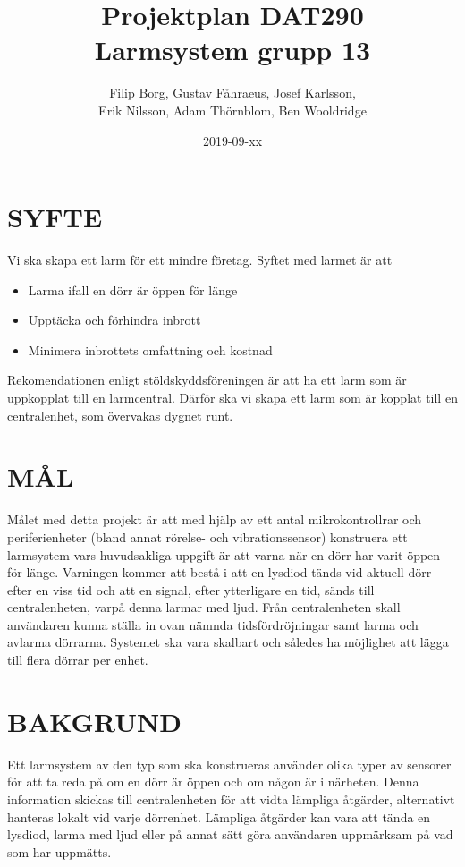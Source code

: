 \documentclass[a4paper]{article}
\title{Projektplan DAT290 \\ \Large Larmsystem grupp 13}
\author{Filip Borg, Gustav Fåhraeus, Josef Karlsson,\\
            Erik Nilsson, Adam Thörnblom, Ben Wooldridge}
\date{2019-09-xx}
\begin{document}
\maketitle
{}
\newpage

\tableofcontents
\newpage



\section{SYFTE}
\label{sec:syfte}

Vi ska skapa ett larm för ett mindre företag. Syftet med larmet är att
\begin{itemize}
    \item Larma ifall en dörr är öppen för länge
    \item Upptäcka och förhindra inbrott
    \item Minimera inbrottets omfattning och kostnad

\end{itemize}
Rekomendationen enligt stöldskyddsföreningen är att ha ett larm
som är uppkopplat till en larmcentral. Därför ska vi skapa ett larm som är kopplat till en centralenhet,
 som övervakas dygnet runt.

\section{MÅL}
\label{sec:mål}

Målet med detta projekt är att med hjälp av ett antal mikrokontrollrar och periferienheter (bland annat rörelse- och vibrationssensor) konstruera ett larmsystem vars huvudsakliga uppgift är att varna när en dörr har varit öppen för länge. Varningen kommer att bestå i att en lysdiod tänds vid aktuell dörr efter en viss tid och att en signal, efter ytterligare en tid, sänds till centralenheten, varpå denna larmar med ljud. Från centralenheten skall användaren kunna ställa in ovan nämnda tidsfördröjningar samt larma och avlarma dörrarna. Systemet ska vara skalbart och således ha möjlighet att lägga till flera dörrar per enhet.

\section{BAKGRUND}
\label{sec:bakgrund}

Ett larmsystem av den typ som ska konstrueras använder olika typer av sensorer för att ta reda på om en dörr är öppen och om någon är i närheten. Denna information skickas till centralenheten för att vidta lämpliga åtgärder, alternativt hanteras lokalt vid varje dörrenhet.
Lämpliga åtgärder kan vara att tända en lysdiod, larma med ljud eller på annat sätt göra användaren uppmärksam på vad som har uppmätts.
\end{document}
